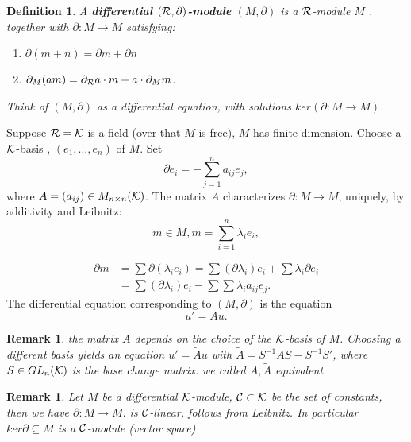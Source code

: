 \documentclass[11pt]{article}
\newtheorem{dfn}[thm]{Definition}
\newtheorem{rmk}[thm]{Remark}
\newcommand{\pd}{\partial}
\newcommand{\calc}{{\cal C}}
\newcommand{\calk}{{\cal K}}
\newcommand{\calr}{{\cal R}}
\begin{document}
\begin{dfn}
A \textbf{differential $(\calr, \pd)$-module} $(M,\pd)$ is a $\calr$-module  $M$ , together with $\pd: M\rightarrow M $ satisfying:
\begin{enumerate}
\item $\pd(m+n)=\pd m+\pd n$
\item $\pd_M(a m)=\pd_\calr a \cdot m+a\cdot \pd_M m$.
\end{enumerate}
Think of $(M,\pd)$ as a differential equation, with solutions $ker(\pd :M\rightarrow M).$
\end{dfn}
Suppose $\calr=\calk$ is a field (over that $M$ is free), $M $ has finite dimension.
Choose a $\calk$-basis , $(e_1,...,e_n)$ of $M$.
Set
$$
\pd e_i=-\sum_{j=1}^n a_{ij} e_j,
$$
where $A=(a_{ij})\in  M_{n \times n}(\calk)$. 
The matrix $A$ characterizes $\pd :M\rightarrow M$, uniquely, by additivity and Leibnitz:
$$
m\in M, m=\sum_{i=1}^n \lambda_i e_i,
$$

$$
\begin{aligned}
\pd m & =\sum \pd (\lambda_i e_i)=\sum (\pd \lambda_i)e_i+\sum \lambda_i \pd e_i\\
&=\sum(\pd \lambda_i) e_i-\sum \sum \lambda_i a_{ij} e_j.
\end{aligned}
$$
The differential equation corresponding to $(M,\pd)$ is  the equation
$$
u'=A u.
$$
\begin{rmk}
the matrix $A$ depends on the choice of the $\calk$-basis of $M$. Choosing a different basis yields an equation $u'=\tilde{A}u$ with $\tilde{A}=S^{-1}A S-S^{-1}S'$, where $S\in GL_n(\calk)$ is the base change matrix. we called $A,\tilde{A}$ equivalent
\end{rmk}
\begin{rmk}
Let $M$ be a differential $\calk$-module, $\calc\subset \calk$ be the set of constants, then we have
$
\pd  :M\rightarrow M.
$ 
is $\calc$-linear, follows from Leibnitz.
In particular $ker \pd\subseteq M$ is a $\calc$-module (vector space)
\end{rmk}
\end{document}
